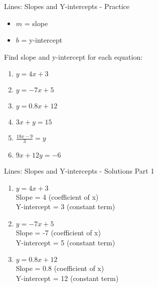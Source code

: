\documentclass[aspectratio=169]{beamer}
\begin{document}
\begin{frame}{Lines: Slopes and Y-intercepts - Practice}
    \begin{tcolorbox}[colback=lightgray,colframe=primary,title=Standard Form: $y = mx + b$]
        \footnotesize
        \begin{itemize}
            \setlength{\itemsep}{0pt}
            \addtolength{\itemsep}{-0.5em}
            \item $m$ = slope
            \item $b$ = y-intercept
        \end{itemize}
    \end{tcolorbox}
    \vspace*{-1em}
    \begin{tcolorbox}[colback=lightgray,colframe=primary,title=Practice Problems]
        \footnotesize
        Find slope and y-intercept for each equation:
        \begin{enumerate}
            \setlength{\itemsep}{0pt}
            \addtolength{\itemsep}{-0.5em}
            \item $y = 4x + 3$
            \item $y = -7x + 5$
            \item $y = 0.8x + 12$
            \item $3x + y = 15$
            \item $\frac{18x - 9}{3} = y$
            \item $9x + 12y = -6$
        \end{enumerate}
    \end{tcolorbox}
    \vfill
\end{frame}

\begin{frame}{Lines: Slopes and Y-intercepts - Solutions Part 1}
    \begin{tcolorbox}[colback=lightgray,colframe=accent,title=Detailed Solutions]
        \begin{enumerate}
            \item $y = 4x + 3$ \\
                Slope = 4 (coefficient of x) \\
                Y-intercept = 3 (constant term)
            
            \item $y = -7x + 5$ \\
                Slope = -7 (coefficient of x) \\
                Y-intercept = 5 (constant term)
            
            \item $y = 0.8x + 12$ \\
                Slope = 0.8 (coefficient of x) \\
                Y-intercept = 12 (constant term)
        \end{enumerate}
    \end{tcolorbox}
\end{frame}
\end{document}
